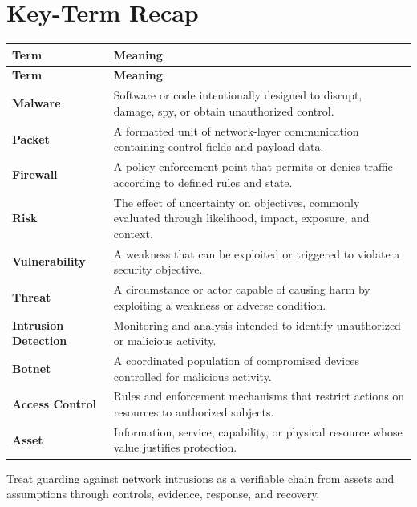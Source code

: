 \documentclass[11pt]{article}
\begin{document}
\section*{Key-Term Recap}
\begin{longtable}{>{\RaggedRight\arraybackslash}p{}>{\RaggedRight\arraybackslash}p{}}
\toprule\rowcolor{Navy}\color{white}\textbf{Term} & \color{white}\textbf{Meaning}\\\midrule
\endfirsthead
\toprule\rowcolor{Navy}\color{white}\textbf{Term} & \color{white}\textbf{Meaning}\\\midrule
\endhead
\textbf{Malware} & Software or code intentionally designed to disrupt, damage, spy, or obtain unauthorized control. \\\midrule
\textbf{Packet} & A formatted unit of network-layer communication containing control fields and payload data. \\\midrule
\textbf{Firewall} & A policy-enforcement point that permits or denies traffic according to defined rules and state. \\\midrule
\textbf{Risk} & The effect of uncertainty on objectives, commonly evaluated through likelihood, impact, exposure, and context. \\\midrule
\textbf{Vulnerability} & A weakness that can be exploited or triggered to violate a security objective. \\\midrule
\textbf{Threat} & A circumstance or actor capable of causing harm by exploiting a weakness or adverse condition. \\\midrule
\textbf{Intrusion Detection} & Monitoring and analysis intended to identify unauthorized or malicious activity. \\\midrule
\textbf{Botnet} & A coordinated population of compromised devices controlled for malicious activity. \\\midrule
\textbf{Access Control} & Rules and enforcement mechanisms that restrict actions on resources to authorized subjects. \\\midrule
\textbf{Asset} & Information, service, capability, or physical resource whose value justifies protection. \\\midrule
\bottomrule
\end{longtable}
\begin{takeawaybox}
Treat guarding against network intrusions as a verifiable chain from assets and assumptions through controls, evidence, response, and recovery.
\end{takeawaybox}
\end{document}

